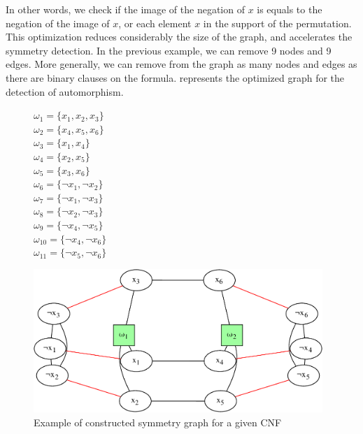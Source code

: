 In other words, we check if the image of the negation of $x$ is equals to the negation of the image of $x$,
or each element $x$ in the support of the permutation.
This optimization reduces considerably the size of the 
graph, and accelerates the symmetry detection.
In the previous example, we can remove 9 nodes and 9 edges. More generally,
we can remove from the graph as many nodes and edges as there are binary clauses on the formula.
 represents the optimized graph for the detection of automorphism.
\begin{figure}[!htbp]
 \begin{minipage}[r]{.2\textwidth}
   $\omega_{1} = \{ x_{1}, x_{2}, x_{3} \}$ \\
 $\omega_{2} = \{ x_{4}, x_{5}, x_{6} \}$ \\
 $\omega_{3} = \{ x_{1}, x_{4} \}$ \\
 $\omega_{4} = \{ x_{2}, x_{5} \}$ \\
 $\omega_{5} = \{ x_{3}, x_{6} \}$ \\
 $\omega_{6} = \{ \neg x_{1}, \neg x_{2} \}$ \\
 $\omega_{7} = \{ \neg x_{1}, \neg x_{3} \}$ \\
 $\omega_{8} = \{ \neg x_{2}, \neg x_{3} \}$ \\
 $\omega_{9} = \{ \neg x_{4}, \neg x_{5} \}$ \\
 $\omega_{10} = \{ \neg x_{4}, \neg x_{6} \}$ \\
 $\omega_{11} = \{ \neg x_{5}, \neg x_{6} \}$ \\
 \end{minipage}
 \begin{minipage}[r]{.75\textwidth}
  \includegraphics[width=4.3in]{cnfs/graph_cnf_opt-crop}
 \end{minipage}
 \caption{Example of constructed symmetry graph for a given CNF}
  \label{fig:graph_opt}
\end{figure}

